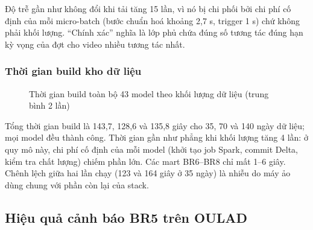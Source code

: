 Độ trễ gần như không đổi khi tải tăng 15 lần, vì nó bị chi phối bởi chi phí cố định của mỗi micro-batch (bước chuẩn hoá khoảng 2,7 s, trigger 1 s) chứ không phải khối lượng. ``Chính xác'' nghĩa là lớp phủ chứa đúng số tương tác đúng hạn kỳ vọng của đợt cho video nhiều tương tác nhất.

\subsubsection{Thời gian build kho dữ liệu}

\begin{figure}[H]
\centering
{}
\caption{Thời gian build toàn bộ 43 model theo khối lượng dữ liệu (trung bình 2 lần)}
\label{fig:build}
\end{figure}

Tổng thời gian build là 143,7, 128,6 và 135,8 giây cho 35, 70 và 140 ngày dữ liệu; mọi model đều thành công. Thời gian gần như phẳng khi khối lượng tăng 4 lần: ở quy mô này, chi phí cố định của mỗi model (khởi tạo job Spark, commit Delta, kiểm tra chất lượng) chiếm phần lớn. Các mart BR6--BR8 chỉ mất 1--6 giây. Chênh lệch giữa hai lần chạy (123 và 164 giây ở 35 ngày) là nhiễu do máy ảo dùng chung với phần còn lại của stack.

\subsection{Hiệu quả cảnh báo BR5 trên OULAD}

